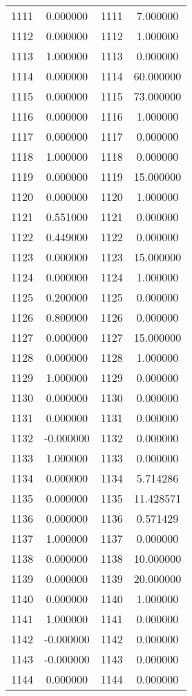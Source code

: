 \documentclass[12pt]{article}
\begin{document}
\begin{longtable}{@{}cccc@{}}
1111 & 0.000000 & 1111 & 7.000000 \\
1112 & 0.000000 & 1112 & 1.000000 \\
1113 & 1.000000 & 1113 & 0.000000 \\
1114 & 0.000000 & 1114 & 60.000000 \\
1115 & 0.000000 & 1115 & 73.000000 \\
1116 & 0.000000 & 1116 & 1.000000 \\
1117 & 0.000000 & 1117 & 0.000000 \\
1118 & 1.000000 & 1118 & 0.000000 \\
1119 & 0.000000 & 1119 & 15.000000 \\
1120 & 0.000000 & 1120 & 1.000000 \\
1121 & 0.551000 & 1121 & 0.000000 \\
1122 & 0.449000 & 1122 & 0.000000 \\
1123 & 0.000000 & 1123 & 15.000000 \\
1124 & 0.000000 & 1124 & 1.000000 \\
1125 & 0.200000 & 1125 & 0.000000 \\
1126 & 0.800000 & 1126 & 0.000000 \\
1127 & 0.000000 & 1127 & 15.000000 \\
1128 & 0.000000 & 1128 & 1.000000 \\
1129 & 1.000000 & 1129 & 0.000000 \\
1130 & 0.000000 & 1130 & 0.000000 \\
1131 & 0.000000 & 1131 & 0.000000 \\
1132 & -0.000000 & 1132 & 0.000000 \\
1133 & 1.000000 & 1133 & 0.000000 \\
1134 & 0.000000 & 1134 & 5.714286 \\
1135 & 0.000000 & 1135 & 11.428571 \\
1136 & 0.000000 & 1136 & 0.571429 \\
1137 & 1.000000 & 1137 & 0.000000 \\
1138 & 0.000000 & 1138 & 10.000000 \\
1139 & 0.000000 & 1139 & 20.000000 \\
1140 & 0.000000 & 1140 & 1.000000 \\
1141 & 1.000000 & 1141 & 0.000000 \\
1142 & -0.000000 & 1142 & 0.000000 \\
1143 & -0.000000 & 1143 & 0.000000 \\
1144 & 0.000000 & 1144 & 0.000000 \\

\end{longtable}
\end{document}
